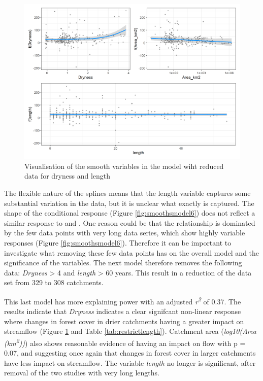 \documentclass[]{elsarticle} %
\begin{document}
\begin{figure}
\includegraphics[width=0.9\linewidth]{model7_smooths} \caption{Visualisation of the smooth variables in the model wiht reduced data for dryness and length}\label{fig:smoothsmodel7}
\end{figure}

The flexible nature of the splines means that the length variable captures some substantial variation in the data, but it is unclear what exactly is captured. The shape of the conditional response (Figure \ref{fig:smoothsmodel6}) does not reflect a similar response to \citet{filoso2017} and \citet{jackson2005}. One reason could be that the relationship is dominated by the few data points with very long data series, which show highly variable responses (Figure \ref{fig:smoothsmodel6}). Therefore it can be important to investigate what removing these few data points has on the overall model and the significance of the variables. The next model therefore removes the following data: \emph{Dryness} \textgreater{} 4 and \emph{length} \textgreater{} 60 years. This result in a reduction of the data set from 329 to 308 catchments.

This last model has more explaining power with an adjusted \emph{r\textsuperscript{2}} of 0.37. The results indicate that \emph{Dryness} indicates a clear signifcant non-linear response where changes in forest cover in drier catchments having a greater impact on streamflow (Figure \ref{fig:smoothsmodel7} and Table \ref{tab:restrictlength}). Catchment area (\emph{log10(Area (km\textsuperscript{2}))}) also shows reasonable evidence of having an impact on flow with p = 0.07, and suggesting once again that changes in forest cover in larger catchments have less impact on streamflow. The variable \emph{length} no longer is significant, after removal of the two studies with very long lengths.
\end{document}

